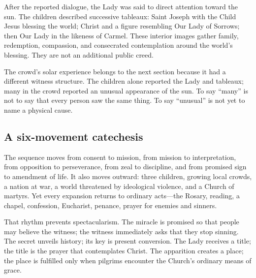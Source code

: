 After the reported dialogue, the Lady was said to direct attention toward the sun. The children described successive tableaux: Saint Joseph with the Child Jesus blessing the world; Christ and a figure resembling Our Lady of Sorrows; then Our Lady in the likeness of Carmel. These interior images gather family, redemption, compassion, and consecrated contemplation around the world's blessing. They are not an additional public creed.

The crowd's solar experience belongs to the next section because it had a different witness structure. The children alone reported the Lady and tableaux; many in the crowd reported an unusual appearance of the sun. To say “many” is not to say that every person saw the same thing. To say “unusual” is not yet to name a physical cause.

\subsection{A six-movement catechesis}

The sequence moves from consent to mission, from mission to interpretation, from opposition to perseverance, from zeal to discipline, and from promised sign to amendment of life. It also moves outward: three children, growing local crowds, a nation at war, a world threatened by ideological violence, and a Church of martyrs. Yet every expansion returns to ordinary acts---the Rosary, reading, a chapel, confession, Eucharist, penance, prayer for enemies and sinners.

That rhythm prevents spectacularism. The miracle is promised so that people may believe the witness; the witness immediately asks that they stop sinning. The secret unveils history; its key is present conversion. The Lady receives a title; the title is the prayer that contemplates Christ. The apparition creates a place; the place is fulfilled only when pilgrims encounter the Church's ordinary means of grace.
